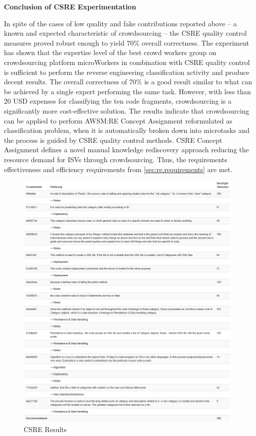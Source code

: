 \textbf{Conclusion of CSRE Experimentation}

In spite of the cases of low quality and fake contributions reported
above -- a known and expected characteristic of crowdsourcing \autocite{Allahbakhsh2013} -- the CSRE quality control measures proved robust enough to yield 70\% overall correctness.
The experiment has shown that the expertise level of the best crowd workers group on crowdsourcing platform microWorkers in combination with CSRE quality control is sufficient to perform the reverse engineering classification activity and produce decent results.
The overall correctness of 70\% is a good result similar to what can be achieved by a single expert performing the same task.
However, with less than 20 USD expenses for classifying the ten code fragments, crowdsourcing is a significantly
more cost-effective solution.
The results indicate that crowdsourcing can be applied to perform AWSM:RE Concept Assignment reformulated as classification problem, when it is automatically broken down into microtasks and the process is guided by CSRE quality control methods.
CSRE Concept Assignment defines a novel manual knowledge rediscovery approach reducing the resource demand for ISVs through crowdsourcing.
Thus, the requirements effectiveness and efficiency requirements from \cref{sec:re.requirements} are met.

\begin{figure}
\hypertarget{fig:crowdrationales}{%
\centering
\includegraphics[width=0.99\textwidth]{../figures/screenshots/csre_cw_answers.png}
\caption{CSRE Results}\label{fig:crowdrationales}
}
\end{figure}

